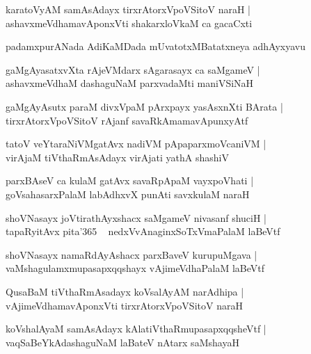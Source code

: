 \documentclass[twoside,12pt,openright]{book}
\newcounter{shloka}[chapter]
\begin{document}
\begin{shloka}
karatoVyAM samAsAdayx tirxrAtorxVpoVSitoV naraH |\\
ashavxmeVdhamavAponxVti shakarxloVkaM ca gacaCxti
\end{shloka}

\begin{center}
padamxpurANada AdiKaMDada mUvatotxMBatatxneya adhAyxyavu 
\end{center}

\begin{shloka}
gaMgAyasatxvXta rAjeVMdarx sAgarasayx ca saMgameV |\\
ashavxmeVdhaM dashaguNaM parxvadaMti maniVSiNaH 
\end{shloka}

\begin{shloka}
gaMgAyAsutx paraM divxVpaM pArxpayx yasAsxnXti BArata |\\
tirxrAtorxVpoVSitoV rAjanf savaRkAmamavApunxyAtf 
\end{shloka}

\begin{shloka}
tatoV veYtaraNiVMgatAvx nadiVM pApaparxmoVcaniVM |\\
virAjaM tiVthaRmAsAdayx virAjati yathA shashiV 
\end{shloka}

\begin{shloka}
parxBAseV ca kulaM gatAvx savaRpApaM vayxpoVhati |\\
goVsahasarxPalaM labAdhxvX punAti savxkulaM naraH 
\end{shloka}

\begin{shloka}
shoVNasayx joVtirathAyxshacx saMgameV nivasanf shuciH |\\
tapaRyitAvx pita\char'365 ~ nedxVvAnaginxSoTxVmaPalaM laBeVtf 
\end{shloka}

\begin{shloka}
shoVNasayx namaRdAyAshacx parxBaveV kurupuMgava |\\
vaMshagulamxmupasapxqqshayx vAjimeVdhaPalaM laBeVtf 
\end{shloka}

\begin{shloka}
QusaBaM tiVthaRmAsadayx koVsalAyAM narAdhipa |\\
vAjimeVdhamavAponxVti tirxrAtorxVpoVSitoV naraH 
\end{shloka}

\begin{shloka}
koVshalAyaM samAsAdayx kAlatiVthaRmupasapxqqsheVtf |\\
vaqSaBeYkAdashaguNaM laBateV nAtarx saMshayaH 
\end{shloka}
\end{document}
